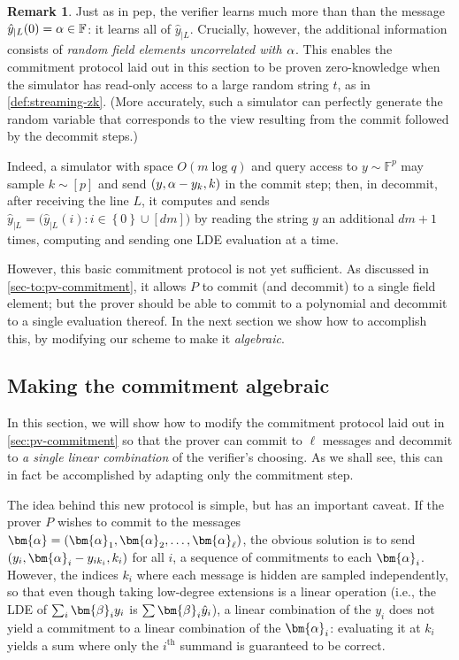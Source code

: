 \documentclass[a4paper,UKenglish,cleveref, autoref, thm-restate]{lipics-v2021}
\theoremstyle{definition}
\newtheorem{remark}[theorem]{Remark}
\newcommand{\field}{\mathbb{F}}
\renewcommand{\set}[1]{\left\{#1\right\}}
\newcommand{\pepprotocol}{\textsf{pep}\xspace}
\newcommand{\pcommitlength}{p}
\newcommand{\pcommitstring}{y}
\newcommand{\dimension}{m}
\newcommand{\degree}{d}
\newcommand{\fieldsize}{q}
\newcommand{\evaluationpoint}{\bm{\fe2}}
\renewcommand{\line}{L}
\def\fe#1{
    \ifnum#1=1
        \alpha
    \else
    \ifnum#1=2
        \beta
    \else
    \ifnum#1=3
        \gamma
    \fi\fi\fi
}
\begin{document}
\begin{remark}
    Just as in \pepprotocol, the verifier learns much more than than the message $\hat \pcommitstring_{|\line}(0) = \fe1 \in \field$: it learns all of $\hat \pcommitstring_{|\line}$. Crucially, however, the additional information consists of \emph{random field elements uncorrelated with $\fe1$}. This enables the commitment protocol laid out in this section to be proven zero-knowledge when the simulator has read-only access to a large random string $t$, as in \cref{def:streaming-zk}. (More accurately, such a simulator can perfectly generate the random variable that corresponds to the view resulting from the \textsf{commit} followed by the \textsf{decommit} steps.)
    
    Indeed, a simulator with space $O(\dimension \log \fieldsize)$ and query access to $\pcommitstring \sim \field^\pcommitlength$ may sample $k \sim [\pcommitlength]$ and send $(\pcommitstring, \fe1 - \pcommitstring_k, k)$ in the \textsf{commit} step; then, in \textsf{decommit}, after receiving the line $\line$, it computes and sends $\hat y_{|\line} = \big(\hat \pcommitstring_{|\line}(i) : i \in \set{0} \cup [\degree\dimension]\big)$ by reading the string $\pcommitstring$ an additional $\degree \dimension + 1$ times, computing and sending one LDE evaluation at a time.
\end{remark}

However, this basic commitment protocol is not yet sufficient. As discussed in \cref{sec-to:pv-commitment}, it allows $P$ to commit (and decommit) to a single field element; but the prover should be able to commit to a polynomial and decommit to a single evaluation thereof. In the next section we show how to accomplish this, by modifying our scheme to make it \emph{algebraic}.

\subsection{Making the commitment algebraic}
\label{sec:pv-algebraic-commitment}

In this section, we will show how to modify the commitment protocol laid out in \cref{sec:pv-commitment} so that the prover can commit to $\ell$ messages and decommit to \emph{a single linear combination} of the verifier's choosing. As we shall see, this can in fact be accomplished by adapting only the commitment step.

The idea behind this new protocol is simple, but has an important caveat. If the prover $P$ wishes to commit to the messages $\bm{\fe1} = (\bm{\fe1}_1, \bm{\fe1}_2, \ldots, \bm{\fe1}_\ell)$, the obvious solution is to send $(\pcommitstring_i, \bm{\fe1}_i - \pcommitstring_{ik_i}, k_i)$ for all $i$, a sequence of commitments to each $\bm{\fe1}_i$. However, the indices $k_i$ where each message is hidden are sampled independently, so that even though taking low-degree extensions is a linear operation (i.e., the LDE of $\sum_i \evaluationpoint_i \pcommitstring_i$ is $\sum \evaluationpoint_i \hat \pcommitstring_i$), a linear combination of the $\pcommitstring_i$ does not yield a commitment to a linear combination of the $\bm{\fe1}_i$: evaluating it at $k_i$ yields a sum where only the $i^\text{th}$ summand is guaranteed to be correct.
\end{document}
